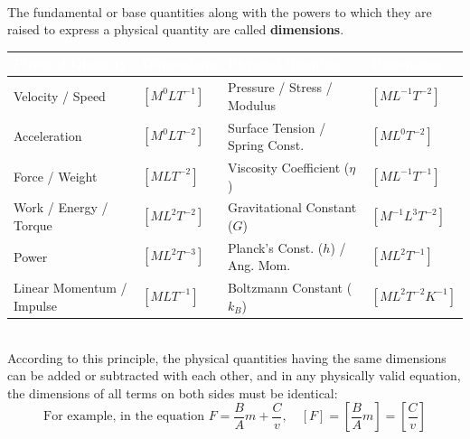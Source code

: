 \documentclass[11pt,a4paper]{article}
\begin{document}
\vspace{5pt}
\noindent{\large\textbf{\textsf{\textcolor{primaryDark}{1.3 Dimensions \& Dimensional Formulas}}}}\\[3pt]
The fundamental or base quantities along with the powers to which they are raised to express a physical quantity are called \textbf{dimensions}.
\begin{center}
\renewcommand{\arraystretch}{1.25}
\small
\begin{tabularx}{\linewidth}{|>{\raggedright\arraybackslash}X|>{\centering\arraybackslash}m{2.4cm}||>{\raggedright\arraybackslash}X|>{\centering\arraybackslash}m{2.8cm}|}
\hline
\rowcolor{tableDarkHeader}
\textcolor{white}{\textbf{Physical Quantity}} & \textcolor{white}{\textbf{Dimensions}} & \textcolor{white}{\textbf{Physical Quantity}} & \textcolor{white}{\textbf{Dimensions}} \\
\hline
\rowcolor{white}
Velocity / Speed & $[M^0 L T^{-1}]$ & Pressure / Stress / Modulus & $[M L^{-1} T^{-2}]$ \\
\hline
\rowcolor{tableStripe}
Acceleration & $[M^0 L T^{-2}]$ & Surface Tension / Spring Const. & $[M L^0 T^{-2}]$ \\
\hline
\rowcolor{white}
Force / Weight & $[M L T^{-2}]$ & Viscosity Coefficient ($\eta$) & $[M L^{-1} T^{-1}]$ \\
\hline
\rowcolor{tableStripe}
Work / Energy / Torque & $[M L^2 T^{-2}]$ & Gravitational Constant ($G$) & $[M^{-1} L^3 T^{-2}]$ \\
\hline
\rowcolor{white}
Power & $[M L^2 T^{-3}]$ & Planck's Const. ($h$) / Ang. Mom. & $[M L^2 T^{-1}]$ \\
\hline
\rowcolor{tableStripe}
Linear Momentum / Impulse & $[M L T^{-1}]$ & Boltzmann Constant ($k_B$) & $[M L^2 T^{-2} K^{-1}]$ \\
\hline
\end{tabularx}
\end{center}

\vspace{4pt}
\noindent{\large\textbf{\textsf{\textcolor{primaryDark}{1.4 Principle of Homogeneity of Dimensions}}}}\\[3pt]
According to this principle, the physical quantities having the same dimensions can be added or subtracted with each other, and in any physically valid equation, the dimensions of all terms on both sides must be identical:
\[
  \text{For example, in the equation } F = \frac{B}{A} m + \frac{C}{v}, \quad [F] = \left[\frac{B}{A}m\right] = \left[\frac{C}{v}\right]
\]
\end{document}

